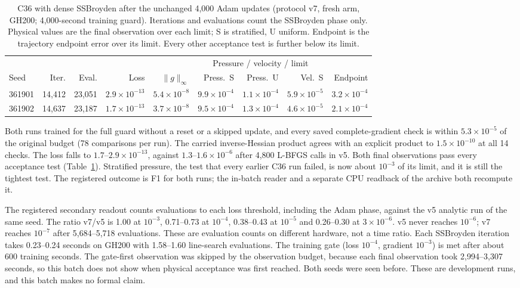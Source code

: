 \documentclass[11pt]{article}
\begin{document}
\begin{table}[htbp]\centering\small
\setlength{\tabcolsep}{4pt}
\caption{C36 with dense SSBroyden after the unchanged 4,000 Adam updates
(protocol v7, fresh arm, GH200; 4,000-second training guard). Iterations
and evaluations count the SSBroyden phase only. Physical values are the
final observation over each limit; S is stratified, U uniform. Endpoint is
the trajectory endpoint error over its limit. Every other acceptance test
is further below its limit.}
\label{tab:c36v7}
\begin{tabular}{lrrrrrrrr}\toprule
 & & & & & \multicolumn{3}{c}{Pressure / velocity / limit} & \\\cmidrule(lr){6-8}
Seed & Iter. & Eval. & Loss & $\|g\|_\infty$ & Press.~S & Press.~U & Vel.~S & Endpoint\\\midrule
361901 & 14,412 & 23,051 & $2.9\times10^{-13}$ & $5.4\times10^{-8}$ & $9.9\times10^{-4}$ & $1.1\times10^{-4}$ & $5.9\times10^{-5}$ & $3.2\times10^{-4}$\\
361902 & 14,637 & 23,187 & $1.7\times10^{-13}$ & $3.7\times10^{-8}$ & $9.5\times10^{-4}$ & $1.3\times10^{-4}$ & $4.6\times10^{-5}$ & $2.1\times10^{-4}$
\\\bottomrule\end{tabular}
\end{table}

Both runs trained for the full guard without a reset or a skipped update,
and every saved complete-gradient check is within $5.3\times10^{-5}$ of the
original budget (78 comparisons per run). The carried inverse-Hessian
product agrees with an explicit product to $1.5\times10^{-10}$ at all 14
checks. The loss falls to $1.7$--$2.9\times10^{-13}$, against
$1.3$--$1.6\times10^{-6}$ after 4,800 L-BFGS calls in v5. Both final
observations pass every acceptance test (Table~\ref{tab:c36v7}). Stratified
pressure, the test that every earlier C36 run failed, is now about $10^{-3}$
of its limit, and it is still the tightest test. The registered outcome is
F1 for both runs; the in-batch reader and a separate CPU readback of the
archive both recompute it.

The registered secondary readout counts evaluations to each loss threshold,
including the Adam phase, against the v5 analytic run of the same seed. The
ratio v7/v5 is 1.00 at $10^{-3}$, 0.71--0.73 at $10^{-4}$, 0.38--0.43 at
$10^{-5}$ and 0.26--0.30 at $3\times10^{-6}$. v5 never reaches $10^{-6}$; v7
reaches $10^{-7}$ after 5,684--5,718 evaluations. These are evaluation
counts on different hardware, not a time ratio. Each SSBroyden iteration
takes 0.23--0.24 seconds on GH200 with 1.58--1.60 line-search evaluations.
The training gate (loss $10^{-4}$, gradient $10^{-3}$) is met after about
600 training seconds. The gate-first observation was skipped by the
observation budget, because each final observation took 2,994--3,307
seconds, so this batch does not show when physical acceptance was first
reached. Both seeds were seen before. These are development runs, and this
batch makes no formal claim.
\end{document}
